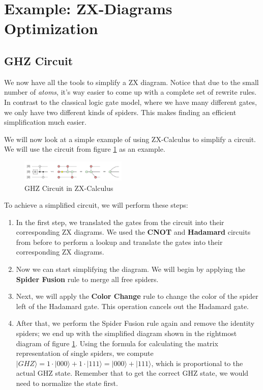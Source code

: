 \section{Example: ZX-Diagrams Optimization}

\subsection{GHZ Circuit}

We now have all the tools to simplify a ZX diagram. Notice that due to the small number of \textit{atoms}, it's way easier to come up with a complete set of rewrite rules. In contrast to the classical logic gate model, where we have many different gates, we only have two different kinds of spiders. This makes finding an efficient simplification much easier.

We will now look at a simple example of using ZX-Calculus to simplify a circuit. We will use the circuit from figure \ref{fig:ghz} as an example.

\begin{figure}
    \centering
    \includegraphics[width=0.45\textwidth]{images/ghz.png}
    \caption{GHZ Circuit in ZX-Calculus}
    \label{fig:ghz}
\end{figure}

To achieve a simplified circuit, we will perform these steps:

\begin{enumerate}
    \item
          In the first step, we translated the gates from the circuit into their corresponding ZX diagrams. We used the \textbf{CNOT} and \textbf{Hadamard} circuits from before to perform a lookup and translate the gates into their corresponding ZX diagrams.
    \item
          Now we can start simplifying the diagram. We will begin by applying the \textbf{Spider Fusion} rule to merge all free spiders.
    \item
          Next, we will apply the \textbf{Color Change} rule to change the color of the spider left of the Hadamard gate. This operation cancels out the Hadamard gate.
    \item
          After that, we perform the Spider Fusion rule again and remove the identity spiders; we end up with the simplified diagram shown in the rightmost diagram of figure \ref{fig:ghz}. Using the formula for calculating the matrix representation of single spiders, we compute $|GHZ\rangle = 1\cdot |000\rangle + 1\cdot |111\rangle = |000\rangle + |111\rangle$, which is proportional to the actual GHZ state. Remember that to get the correct GHZ state, we would need to normalize the state first.
\end{enumerate}

